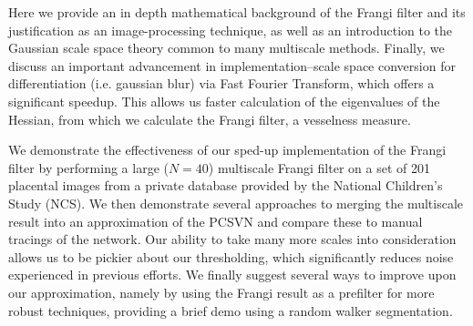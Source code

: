Here we provide an in depth mathematical background of the Frangi filter and
its justification as an image-processing technique, as well as an introduction
to the Gaussian scale space theory common to many multiscale methods. Finally,
we discuss an important advancement in implementation--scale space conversion
for differentiation (i.e. gaussian blur) via Fast Fourier Transform, which
offers a significant speedup. This allows us faster calculation of the
eigenvalues of the Hessian, from which we calculate the Frangi filter, a
vesselness measure.

We demonstrate the effectiveness of our sped-up implementation of the Frangi
filter by performing a large ($N=40$) multiscale Frangi filter on a set of 201
placental images from a private database provided by the National Children's
Study (NCS). We then demonstrate several approaches to merging the multiscale
result into an approximation of the PCSVN and compare these to manual tracings
of the network. Our ability to take many more scales into consideration allows
us to be pickier about our thresholding, which significantly reduces noise
experienced in previous efforts. We finally suggest several ways to improve
upon our approximation, namely by using the Frangi result as a prefilter for
more robust techniques, providing a brief demo using a random walker
segmentation.
